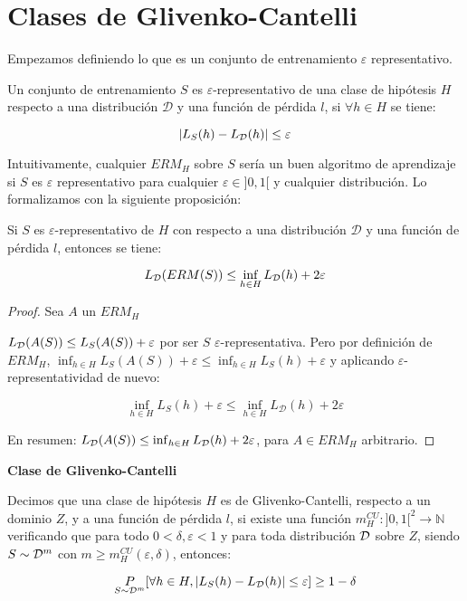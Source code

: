 \section{Clases de Glivenko-Cantelli}

Empezamos definiendo lo que es un conjunto de entrenamiento $\varepsilon$ representativo.

\begin{definition*}
 Un conjunto de entrenamiento $S$ es $\varepsilon$-representativo de una clase de hipótesis $H$ respecto a una
 distribución $\mathcal{D}$ y una función de pérdida $l$, si $\forall h\in H$ se tiene:
 
 \[|L_S(h) - L_{\mathcal{D}}(h)| \le \varepsilon\]
\end{definition*}

Intuitivamente, cualquier $ERM_H$ sobre $S$ sería un buen algoritmo de aprendizaje 
si $S$ es $\varepsilon$ representativo para cualquier $\varepsilon \in ]0,1[$ y cualquier distribución. 
Lo formalizamos con la siguiente proposición:

\begin{fact}
 Si $S$ es $\varepsilon$-representativo de $H$ con respecto a una distribución $\mathcal{D}$ y una función de 
 pérdida $l$, entonces se tiene:
 
 \[L_{\mathcal{D}}(ERM(S)) \le \inf_{h\in H} L_{\mathcal{D}}(h) + 2\varepsilon\]
 
 \label{fact:epsilon-rep}
\end{fact}

\begin{proof}
 Sea $A$ un $ERM_H$
 
 $L_{\mathcal{D}}(A(S)) \le L_S(A(S)) + \varepsilon$ por ser $S$ $\varepsilon$-representativa. Pero por definición de 
 $ERM_H$, $\inf_{h\in H} L_S(A(S)) + \varepsilon \le \inf_{h\in H}L_S(h) + \varepsilon$ y aplicando $\varepsilon$-representatividad de nuevo:
 
 \[\inf_{h\in H} L_S(h) + \varepsilon \le \inf_{h\in H} L_{\mathcal{D}}(h) + 2\varepsilon\]
 
 En resumen: $L_{\mathcal{D}}(A(S)) \le \inf_{h\in H} L_{\mathcal{D}}(h) + 2\varepsilon$, para $A \in ERM_H$ arbitrario.
\end{proof}


\begin{definition*} \textbf{Clase de Glivenko-Cantelli}

Decimos que una clase de hipótesis $H$ es de Glivenko-Cantelli, respecto a un dominio $Z$, y a 
una función de pérdida $l$, si existe una función ${m_{H}^{CU}: ]0,1[^2 \rightarrow \mathbb{N}}$ 
verificando que para todo $0 < \delta, \varepsilon < 1$ y para toda distribución $\mathcal{D}$ sobre $Z$, siendo 
$S\sim \mathcal{D}^m$ con $m \ge m_{H}^{CU}(\varepsilon, \delta)$, 
entonces:

\[\underset{S\sim \mathcal{D}^m}{P} [\forall h\in H, |L_S(h) - L_{\mathcal{D}}(h)| \le \varepsilon] \ge 1-\delta\]
\end{definition*}

